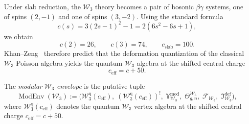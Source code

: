 \begin{example}
\label{ex:w3-slab-reduction}
Under slab reduction, the $\mathcal{W}_3$ theory becomes a pair of
bosonic $\beta\gamma$ systems, one of spins $(2,-1)$ and one of spins
$(3,-2)$.  Using the standard formula
\begin{equation}\label{eq:w3-central-charge-formula}
c(s) = 3(2s-1)^2 - 1 = 2(6s^2 - 6s + 1),
\end{equation}
we obtain
\begin{equation}\label{eq:w3-slab-charges}
c(2) = 26, \qquad c(3) = 74, \qquad c_{\mathrm{slab}} = 100.
\end{equation}
Khan--Zeng~\cite{KhanZeng25} therefore predict that the deformation
quantization of the classical $\mathcal{W}_3$ Poisson algebra yields
the quantum $\mathcal{W}_3$ algebra at the shifted central charge
\begin{equation}\label{eq:w3-ceff}
c_{\mathrm{eff}} = c + 50.
\end{equation}
\end{example}

\begin{definition}
\label{def:w3-modular-envelope}
The \emph{modular $\mathcal{W}_3$ envelope} is the putative tuple
\begin{equation}\label{eq:w3-modular-envelope}
\operatorname{ModEnv}(\mathcal{W}_3)
:=
\bigl(\mathcal{W}_3^{\mathrm{q}}(c_{\mathrm{eff}}),\;
(\mathcal{W}_3^{\mathrm{q}}(c_{\mathrm{eff}}))^{!},\;
\mathbb{Y}_{\mathcal{W}_3}^{\mathrm{mod}},\;
\Theta_{g,n}^{\mathcal{W}_3},\;
\mathcal{F}_{\mathcal{W}_3},\;
\mathfrak{I}_{\mathcal{W}_3}^{\mathrm{def}}\bigr),
\end{equation}
where $\mathcal{W}_3^{\mathrm{q}}(c_{\mathrm{eff}})$ denotes the
quantum $\mathcal{W}_3$ vertex algebra at the shifted central charge
$c_{\mathrm{eff}} = c + 50$.
\end{definition}

